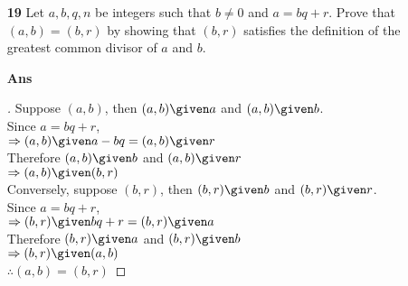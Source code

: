 \documentclass[paper=usletter, fontsize=12pt]{article}
\begin{document}
\begin{itemize}
\begin{itemize}
            \item[\textbf{19}] Let $a, b, q, n$ be integers such that $b
            \ne 0$ and $a = bq + r$. Prove that $(a, b) = (b, r)$ by
            showing that $(b, r)$ satisfies the definition of the greatest
            common divisor of $a$ and $b$.
            \item[\textbf{Ans}]
            \begin{proof}[\unskip\nopunct]
                Suppose $(a,b)$, then $(a,b) \given a$ and $(a,b) \given b$. \\
                Since $a = bq + r$,\\
                $\Rightarrow (a,b) \given a - bq = (a,b) \given r$ \\
                Therefore $(a,b) \given b$ and $(a,b) \given r$ \\
                $\Rightarrow (a,b) \given (b, r)$ \\
                Conversely, suppose $(b,r)$, then $(b,r) \given b$ and $(b,r) \given r$. \\
                Since $a = bq + r$,\\
                $\Rightarrow (b,r) \given bq + r = (b,r) \given a$ \\
                Therefore $(b,r) \given a$ and $(b,r) \given b$ \\
                $\Rightarrow (b,r) \given (a, b)$ \\
                $\therefore (a, b) = (b, r)$ \qedhere
            \end{proof}
            \vspace{0.2in}

        \end{itemize}

    \end{itemize}
\end{document}
